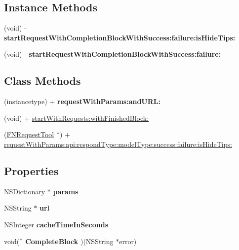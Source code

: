 \subsection*{Instance Methods}
\begin{DoxyCompactItemize}
\item 
\mbox{\label{interface_f_n_request_tool_a07eaa9ee4b9ad1c6dc6c23f64f46ba56}} 
(void) -\/ {\bfseries start\+Request\+With\+Completion\+Block\+With\+Success\+:failure\+:is\+Hide\+Tips\+:}
\item 
\mbox{\label{interface_f_n_request_tool_a44e82e1f10a0ba4ff485a110bf2ccbd9}} 
(void) -\/ {\bfseries start\+Request\+With\+Completion\+Block\+With\+Success\+:failure\+:}
\end{DoxyCompactItemize}
\subsection*{Class Methods}
\begin{DoxyCompactItemize}
\item 
\mbox{\label{interface_f_n_request_tool_a39b69201b37170d1ed3a59737049086b}} 
(instancetype) + {\bfseries request\+With\+Params\+:and\+U\+R\+L\+:}
\item 
(void) + \mbox{\hyperlink{interface_f_n_request_tool_a555e737fd38abea5c4805a7eea5ba26d}{start\+With\+Requests\+:with\+Finished\+Block\+:}}
\item 
(\mbox{\hyperlink{interface_f_n_request_tool}{F\+N\+Request\+Tool}} $\ast$) + \mbox{\hyperlink{interface_f_n_request_tool_ade9c4f4584cedc9dce2e4ef06b604de0}{request\+With\+Params\+:api\+:respond\+Type\+:model\+Type\+:success\+:failure\+:is\+Hide\+Tips\+:}}
\end{DoxyCompactItemize}
\subsection*{Properties}
\begin{DoxyCompactItemize}
\item 
\mbox{\label{interface_f_n_request_tool_a48143e0fe6850bb2bed2108085bc99ab}} 
N\+S\+Dictionary $\ast$ {\bfseries params}
\item 
\mbox{\label{interface_f_n_request_tool_ae984ffdfb41c689d917780ee77d263fb}} 
N\+S\+String $\ast$ {\bfseries url}
\item 
\mbox{\label{interface_f_n_request_tool_a4fb4f2801113a37f9f035687e4069283}} 
N\+S\+Integer {\bfseries cache\+Time\+In\+Seconds}
\item 
\mbox{\label{interface_f_n_request_tool_a23d72d770f5ab2f48b55880057b96c16}} 
void($^\wedge$ {\bfseries Complete\+Block} )(N\+S\+String $\ast$error)
\end{DoxyCompactItemize}


